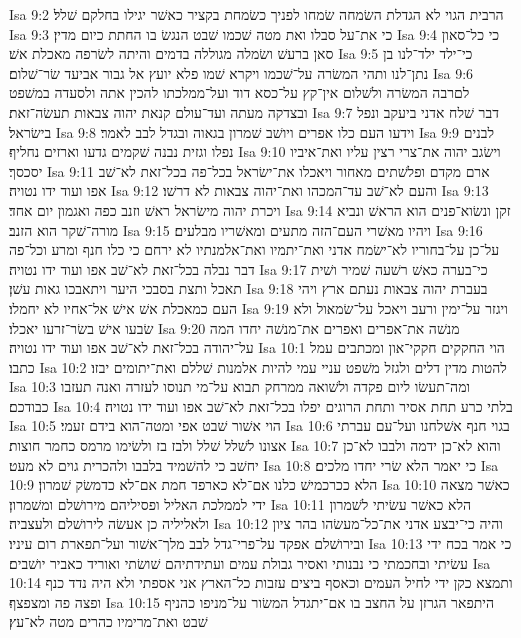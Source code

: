 Isa 9:2  הרבית הגוי לא הגדלת השׂמחה שׂמחו לפניך כשׂמחת בקציר כאשׁר יגילו בחלקם שׁלל׃
Isa 9:3  כי את־על סבלו ואת מטה שׁכמו שׁבט הנגשׂ בו החתת כיום מדין׃
Isa 9:4  כי כל־סאון סאן ברעשׁ ושׂמלה מגוללה בדמים והיתה לשׂרפה מאכלת אשׁ׃
Isa 9:5  כי־ילד ילד־לנו בן נתן־לנו ותהי המשׂרה על־שׁכמו ויקרא שׁמו פלא יועץ אל גבור אביעד שׂר־שׁלום׃
Isa 9:6  לםרבה המשׂרה ולשׁלום אין־קץ על־כסא דוד ועל־ממלכתו להכין אתה ולסעדה במשׁפט ובצדקה מעתה ועד־עולם קנאת יהוה צבאות תעשׂה־זאת׃
Isa 9:7  דבר שׁלח אדני ביעקב ונפל בישׂראל׃
Isa 9:8  וידעו העם כלו אפרים ויושׁב שׁמרון בגאוה ובגדל לבב לאמר׃
Isa 9:9  לבנים נפלו וגזית נבנה שׁקמים גדעו וארזים נחליף׃
Isa 9:10  וישׂגב יהוה את־צרי רצין עליו ואת־איביו יסכסך׃
Isa 9:11  ארם מקדם ופלשׁתים מאחור ויאכלו את־ישׂראל בכל־פה בכל־זאת לא־שׁב אפו ועוד ידו נטויה׃
Isa 9:12  והעם לא־שׁב עד־המכהו ואת־יהוה צבאות לא דרשׁו׃
Isa 9:13  ויכרת יהוה מישׂראל ראשׁ וזנב כפה ואגמון יום אחד׃
Isa 9:14  זקן ונשׂוא־פנים הוא הראשׁ ונביא מורה־שׁקר הוא הזנב׃
Isa 9:15  ויהיו מאשׁרי העם־הזה מתעים ומאשׁריו מבלעים׃
Isa 9:16  על־כן על־בחוריו לא־ישׂמח אדני ואת־יתמיו ואת־אלמנתיו לא ירחם כי כלו חנף ומרע וכל־פה דבר נבלה בכל־זאת לא־שׁב אפו ועוד ידו נטויה׃
Isa 9:17  כי־בערה כאשׁ רשׁעה שׁמיר ושׁית תאכל ותצת בסבכי היער ויתאבכו גאות עשׁן׃
Isa 9:18  בעברת יהוה צבאות נעתם ארץ ויהי העם כמאכלת אשׁ אישׁ אל־אחיו לא יחמלו׃
Isa 9:19  ויגזר על־ימין ורעב ויאכל על־שׂמאול ולא שׂבעו אישׁ בשׂר־זרעו יאכלו׃
Isa 9:20  מנשׁה את־אפרים ואפרים את־מנשׁה יחדו המה על־יהודה בכל־זאת לא־שׁב אפו ועוד ידו נטויה׃
Isa 10:1  הוי החקקים חקקי־און ומכתבים עמל כתבו׃
Isa 10:2  להטות מדין דלים ולגזל משׁפט עניי עמי להיות אלמנות שׁללם ואת־יתומים יבזו׃
Isa 10:3  ומה־תעשׂו ליום פקדה ולשׁואה ממרחק תבוא על־מי תנוסו לעזרה ואנה תעזבו כבודכם׃
Isa 10:4  בלתי כרע תחת אסיר ותחת הרוגים יפלו בכל־זאת לא־שׁב אפו ועוד ידו נטויה׃
Isa 10:5  הוי אשׁור שׁבט אפי ומטה־הוא בידם זעמי׃
Isa 10:6  בגוי חנף אשׁלחנו ועל־עם עברתי אצונו לשׁלל שׁלל ולבז בז ולשׂימו מרמס כחמר חוצות׃
Isa 10:7  והוא לא־כן ידמה ולבבו לא־כן יחשׁב כי להשׁמיד בלבבו ולהכרית גוים לא מעט׃
Isa 10:8  כי יאמר הלא שׂרי יחדו מלכים׃
Isa 10:9  הלא ככרכמישׁ כלנו אם־לא כארפד חמת אם־לא כדמשׂק שׁמרון׃
Isa 10:10  כאשׁר מצאה ידי לממלכת האליל ופסיליהם מירושׁלם ומשׁמרון׃
Isa 10:11  הלא כאשׁר עשׂיתי לשׁמרון ולאליליה כן אעשׂה לירושׁלם ולעצביה׃
Isa 10:12  והיה כי־יבצע אדני את־כל־מעשׂהו בהר ציון ובירושׁלם אפקד על־פרי־גדל לבב מלך־אשׁור ועל־תפארת רום עיניו׃
Isa 10:13  כי אמר בכח ידי עשׂיתי ובחכמתי כי נבנותי ואסיר גבולת עמים ועתידתיהם שׁושׂתי ואוריד כאביר יושׁבים׃
Isa 10:14  ותמצא כקן ידי לחיל העמים וכאסף ביצים עזבות כל־הארץ אני אספתי ולא היה נדד כנף ופצה פה ומצפצף׃
Isa 10:15  היתפאר הגרזן על החצב בו אם־יתגדל המשׂור על־מניפו כהניף שׁבט ואת־מרימיו כהרים מטה לא־עץ׃
